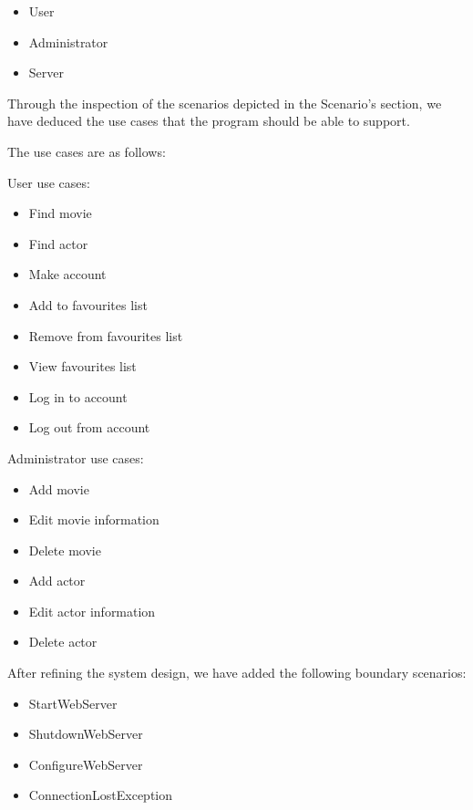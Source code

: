 \begin{itemize}
	\setlength{\itemsep}{-5pt}
	\item User
	\item Administrator
	\item Server
\end{itemize}

Through the inspection of the scenarios depicted in the Scenario’s section, we have deduced the use cases that the program should be able to support.

The use cases are as follows:

User use cases:
\begin{itemize}
	\setlength{\itemsep}{-5pt}
	\item Find movie
	\item Find actor
	\item Make account
	\item Add to favourites list
	\item Remove from favourites list
	\item View favourites list
	\item Log in to account
	\item Log out from account
\end{itemize}

Administrator use cases:
\begin{itemize}
	\item Add movie
	\item Edit movie information
	\item Delete movie
	\item Add actor
	\item Edit actor information
	\item Delete actor
\end{itemize}

After refining the system design, we have added the following boundary scenarios:
\begin{itemize}
	\setlength{\itemsep}{-5pt}
	
	\item StartWebServer
	\item ShutdownWebServer
	\item ConfigureWebServer
	\item ConnectionLostException
\end{itemize}

